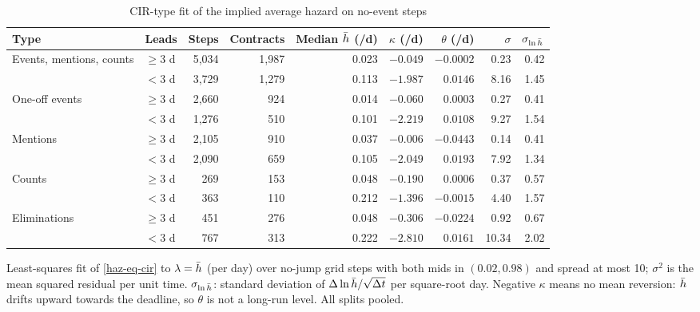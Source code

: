 \begin{table}[ht]
\centering
\begin{threeparttable}
\caption{CIR-type fit of the implied average hazard on no-event steps}\label{haz-tab-cir}
\footnotesize
\begin{tabular}{@{}llrrrrrrr@{}}
\toprule
Type & Leads & Steps & Contracts & Median $\bar h$ (/d) & $\kappa$ (/d) & $\theta$ (/d) & $\sigma$ & $\sigma_{\ln\bar h}$ \\
\midrule
Events, mentions, counts & $\ge 3$ d & 5{,}034 & 1{,}987 & 0.023 & $-0.049$ & $-0.0002$ & 0.23 & 0.42 \\
                         & $<3$ d    & 3{,}729 & 1{,}279 & 0.113 & $-1.987$ & $0.0146$  & 8.16 & 1.45 \\
One-off events           & $\ge 3$ d & 2{,}660 &    924 & 0.014 & $-0.060$ & $0.0003$  & 0.27 & 0.41 \\
                         & $<3$ d    & 1{,}276 &    510 & 0.101 & $-2.219$ & $0.0108$  & 9.27 & 1.54 \\
Mentions                 & $\ge 3$ d & 2{,}105 &    910 & 0.037 & $-0.006$ & $-0.0443$ & 0.14 & 0.41 \\
                         & $<3$ d    & 2{,}090 &    659 & 0.105 & $-2.049$ & $0.0193$  & 7.92 & 1.34 \\
Counts                   & $\ge 3$ d &    269 &    153 & 0.048 & $-0.190$ & $0.0006$  & 0.37 & 0.57 \\
                         & $<3$ d    &    363 &    110 & 0.212 & $-1.396$ & $-0.0015$ & 4.40 & 1.57 \\
Eliminations             & $\ge 3$ d &    451 &    276 & 0.048 & $-0.306$ & $-0.0224$ & 0.92 & 0.67 \\
                         & $<3$ d    &    767 &    313 & 0.222 & $-2.810$ & $0.0161$  & 10.34 & 2.02 \\
\bottomrule
\end{tabular}
\begin{tablenotes}\footnotesize
\item Least-squares fit of \cref{haz-eq-cir} to $\lambda=\bar h$ (per day) over no-jump grid steps
with both mids in $(0.02, 0.98)$ and spread at most 10\textcent; $\sigma^2$ is the mean squared
residual per unit time. $\sigma_{\ln\bar h}$: standard deviation of $\Delta\ln\bar h/\sqrt{\Delta t}$
per square-root day. Negative $\kappa$ means no mean reversion: $\bar h$ drifts upward towards the
deadline, so $\theta$ is not a long-run level. All splits pooled.
\end{tablenotes}
\end{threeparttable}
\end{table}

